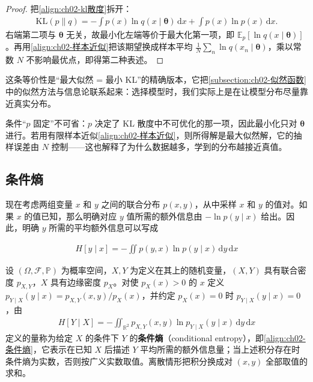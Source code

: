 \documentclass[../../main.tex]{subfiles}
\begin{document}
\begin{proof}
把\eqref{align:ch02-kl散度}拆开：
\begin{align*}
  \mathrm{KL}(p\|q) = -\int p(x)\ln q(x\mid\boldsymbol{\theta})\,\mathrm{d}x + \int p(x)\ln p(x)\,\mathrm{d}x .
\end{align*}
右端第二项与 $\boldsymbol{\theta}$ 无关，故最小化左端等价于最大化第一项，即 $\mathbb{E}_p[\ln q(x\mid\boldsymbol{\theta})]$。再用\eqref{align:ch02-样本近似}把该期望换成样本平均 $\frac{1}{N}\sum_n\ln q(x_n\mid\boldsymbol{\theta})$，乘以常数 $N$ 不影响最优点，即得第二种表述。
\end{proof}

\begin{remark}
这条等价性是“最大似然 = 最小 KL”的精确版本，它把\cref{subsection:ch02-似然函数}中的似然方法与信息论联系起来：选择模型时，我们实际上是在让模型分布尽量靠近真实分布。

条件“$p$ 固定”不可省：$p$ 决定了 KL 散度中不可优化的那一项，因此最小化只对 $\boldsymbol{\theta}$ 进行。若用有限样本近似\eqref{align:ch02-样本近似}，则所得解是最大似然解，它的抽样误差由 $N$ 控制——这也解释了为什么数据越多，学到的分布越接近真值。
\end{remark}

\subsection{条件熵}\label{subsection:ch02-条件熵}

现在考虑两组变量 $x$ 和 $y$ 之间的联合分布 $p(x,y)$，从中采样 $x$ 和 $y$ 的值对。如果 $x$ 的值已知，那么明确对应 $y$ 值所需的额外信息由 $-\ln p(y\mid x)$ 给出。因此，明确 $y$ 所需的平均额外信息可以写成

\begin{align}
  H[y\mid x] = -\iint p(y,x)\ln p(y\mid x)\,\mathrm{d}y\,\mathrm{d}x
  \label{align:ch02-条件熵}
\end{align}

\begin{definition}[条件熵]\label{definition:ch02-条件熵}
设 $(\Omega,\mathcal{F},\mathbb{P})$ 为概率空间，$X,Y$ 为定义在其上的随机变量，$(X,Y)$ 具有联合密度 $p_{X,Y}$，$X$ 具有边缘密度 $p_X$。对使 $p_X(x)>0$ 的 $x$ 定义 $p_{Y\mid X}(y\mid x)=p_{X,Y}(x,y)/p_X(x)$，并约定 $p_X(x)=0$ 时 $p_{Y\mid X}(y\mid x)=0$，由
\begin{align*}
  H[Y\mid X]=-\iint_{\mathbb{R}^{2}}p_{X,Y}(x,y)\ln p_{Y\mid X}(y\mid x)\,\mathrm{d}y\,\mathrm{d}x
\end{align*}
定义的量称为给定 $X$ 的条件下 $Y$ 的\textbf{条件熵}（conditional entropy），即\eqref{align:ch02-条件熵}，它表示在已知 $X$ 后描述 $Y$ 平均所需的额外信息量；当上述积分存在时条件熵为实数，否则按广义实数取值。离散情形把积分换成对 $(x,y)$ 全部取值的求和。
\end{definition}
\end{document}
